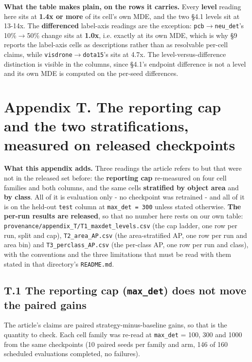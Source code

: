 \documentclass[pdflatex,sn-mathphys-ay]{sn-jnl}
\begin{document}
\textbf{What the table makes plain, on the rows it carries.} Every \textbf{level} reading here sits at \textbf{1.4x or more} of its cell's own MDE, and the two \S{}4.1 levels sit at 13-14x. The \textbf{differenced} label-axis readings are the exception: \texttt{pcb\ensuremath{\rightarrow}neu\_det}'s 10\%\ensuremath{\rightarrow}50\% change sits at \textbf{1.0x}, i.e. exactly at its own MDE, which is why \S{}9 reports the label-axis cells as descriptions rather than as resolvable per-cell claims, while \texttt{visdrone\ensuremath{\rightarrow}dota15}'s sits at 4.7x. The level-versus-difference distinction is visible in the columns, since \S{}4.1's endpoint difference is not a level and its own MDE is computed on the per-seed differences.

\section*{Appendix T. The reporting cap and the two stratifications, measured on released checkpoints}

\textbf{What this appendix adds.} Three readings the article refers to but that were not in the released set before: the \textbf{reporting cap} re-measured on four cell families and both columns, and the same cells \textbf{stratified by object area} and \textbf{by class}. All of it is evaluation only - no checkpoint was retrained - and all of it is on the held-out \texttt{test} column at \texttt{max\_det = 300} unless stated otherwise. \textbf{The per-run results are released}, so that no number here rests on our own table: \texttt{provenance/appendix\_T/T1\_maxdet\_levels.csv} (the cap ladder, one row per run, split and cap), \texttt{T2\_area\_AP.csv} (the area-stratified AP, one row per run and area bin) and \texttt{T3\_perclass\_AP.csv} (the per-class AP, one row per run and class), with the conventions and the three limitations that must be read with them stated in that directory's \texttt{README.md}.

\subsection*{T.1 The reporting cap (\texttt{max\_det}) does not move the paired gains}

The article's claims are paired strategy-minus-baseline gains, so that is the quantity to check. Each cell family was re-read at \texttt{max\_det} = 100, 300 and 1000 from the same checkpoints (10 paired seeds per family and arm, 146 of 160 scheduled evaluations completed, no failures).
\end{document}
